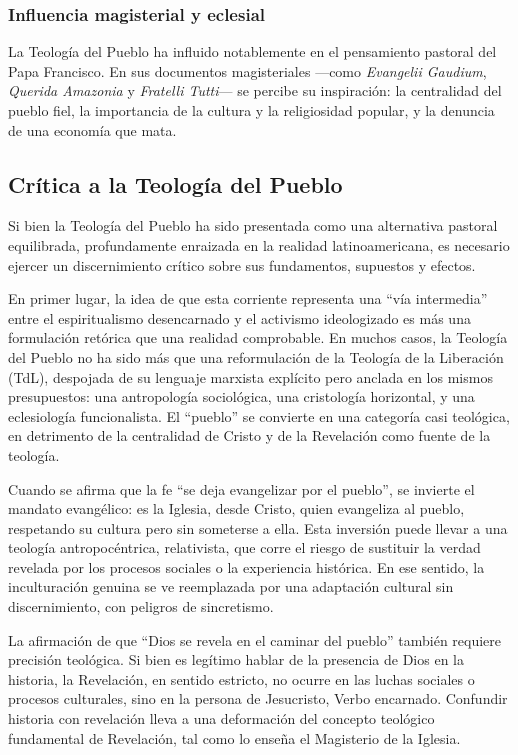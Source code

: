 \documentclass[12pt]{article}
\begin{document}
\subsubsection{Influencia magisterial y eclesial}
La Teología del Pueblo ha influido notablemente en el pensamiento pastoral del Papa Francisco. En sus documentos magisteriales ---como \textit{Evangelii Gaudium}, \textit{Querida Amazonia} y \textit{Fratelli Tutti}--- se percibe su inspiración: la centralidad del pueblo fiel, la importancia de la cultura y la religiosidad popular, y la denuncia de una economía que mata.

\subsection*{Crítica a la Teología del Pueblo}

Si bien la Teología del Pueblo ha sido presentada como una alternativa pastoral equilibrada, profundamente enraizada en la realidad latinoamericana, es necesario ejercer un discernimiento crítico sobre sus fundamentos, supuestos y efectos.

En primer lugar, la idea de que esta corriente representa una “vía intermedia” entre el espiritualismo desencarnado y el activismo ideologizado es más una formulación retórica que una realidad comprobable. En muchos casos, la Teología del Pueblo no ha sido más que una reformulación de la Teología de la Liberación (TdL), despojada de su lenguaje marxista explícito pero anclada en los mismos presupuestos: una antropología sociológica, una cristología horizontal, y una eclesiología funcionalista. El “pueblo” se convierte en una categoría casi teológica, en detrimento de la centralidad de Cristo y de la Revelación como fuente de la teología.

Cuando se afirma que la fe “se deja evangelizar por el pueblo”, se invierte el mandato evangélico: es la Iglesia, desde Cristo, quien evangeliza al pueblo, respetando su cultura pero sin someterse a ella. Esta inversión puede llevar a una teología antropocéntrica, relativista, que corre el riesgo de sustituir la verdad revelada por los procesos sociales o la experiencia histórica. En ese sentido, la inculturación genuina se ve reemplazada por una adaptación cultural sin discernimiento, con peligros de sincretismo.

La afirmación de que “Dios se revela en el caminar del pueblo” también requiere precisión teológica. Si bien es legítimo hablar de la presencia de Dios en la historia, la Revelación, en sentido estricto, no ocurre en las luchas sociales o procesos culturales, sino en la persona de Jesucristo, Verbo encarnado. Confundir historia con revelación lleva a una deformación del concepto teológico fundamental de Revelación, tal como lo enseña el Magisterio de la Iglesia.
\end{document}
